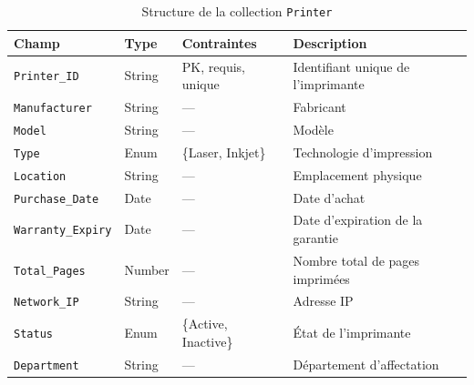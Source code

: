 \documentclass[a4paper,11pt]{report}
\begin{document}
\begin{table}[H]
  \centering
  \small
  \caption{Structure de la collection \texttt{Printer}}
  \label{tab:printer-schema}
  \begin{tabularx}{\textwidth}{l X l X}
    \toprule
    \bf Champ              & \bf Type    & \bf Contraintes               & \bf Description                              \\
    \midrule
    \texttt{Printer\_ID}      & String     & PK, requis, unique            & Identifiant unique de l’imprimante           \\
    \addlinespace
    \texttt{Manufacturer} & String     & —                             & Fabricant                                    \\
    \addlinespace
    \texttt{Model}        & String     & —                             & Modèle                                       \\
    \addlinespace
    \texttt{Type}         & Enum       & \{Laser, Inkjet\}             & Technologie d’impression                     \\
    \addlinespace
    \texttt{Location}     & String     & —                             & Emplacement physique                         \\
    \addlinespace
    \texttt{Purchase\_Date}& Date       & —                             & Date d’achat                                 \\
    \addlinespace
    \texttt{Warranty\_Expiry}& Date     & —                             & Date d’expiration de la garantie             \\
    \addlinespace
    \texttt{Total\_Pages} & Number     & —                             & Nombre total de pages imprimées              \\
    \addlinespace
    \texttt{Network\_IP}  & String     & —                             & Adresse IP                                   \\
    \addlinespace
    \texttt{Status}       & Enum       & \{Active, Inactive\}          & État de l’imprimante                         \\
    \addlinespace
    \texttt{Department}   & String     & —                             & Département d’affectation                    \\
    \bottomrule
  \end{tabularx}
\end{table}
\end{document}
